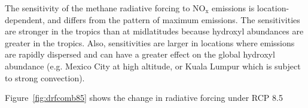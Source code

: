 The sensitivity of the methane radiative forcing to $\mathrm{NO_x}$ emissions is location-dependent, and differs from the pattern of maximum emissions. The sensitivities are stronger in the tropics than at midlatitudes because hydroxyl abundances are greater in the tropics. Also, sensitivities are larger in locations where emissions are rapidly dispersed and can have a greater effect on the global hydroxyl abundance (e.g. Mexico City at high altitude, or Kuala Lumpur which is subject to strong convection).

Figure~\ref{fig:drfcomb85} shows the change in radiative forcing under RCP 8.5